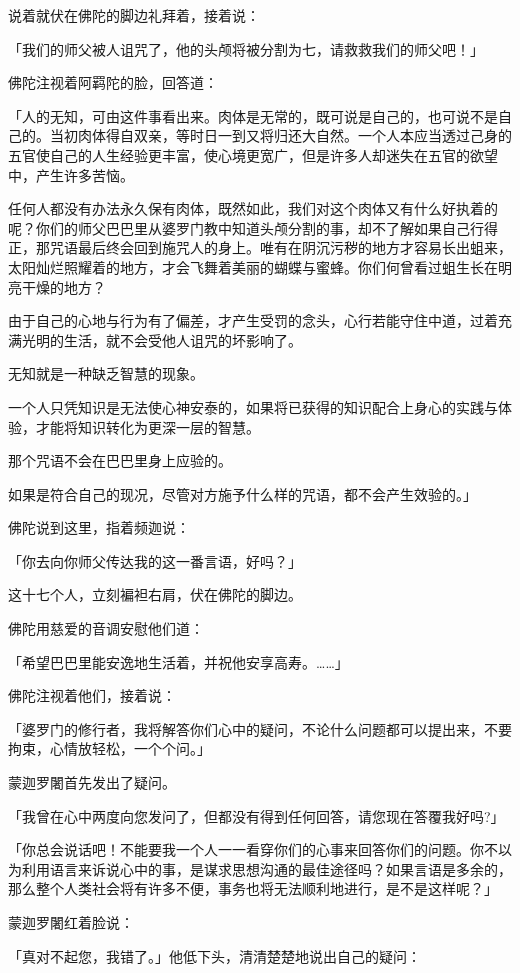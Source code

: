 \documentclass[twoside,openany]{book}
\begin{document}
说着就伏在佛陀的脚边礼拜着，接着说：

「我们的师父被人诅咒了，他的头颅将被分割为七，请救救我们的师父吧！」

佛陀注视着阿羁陀的脸，回答道：

「人的无知，可由这件事看出来。肉体是无常的，既可说是自己的，也可说不是自己的。当初肉体得自双亲，等时日一到又将归还大自然。一个人本应当透过己身的五官使自己的人生经验更丰富，使心境更宽广，但是许多人却迷失在五官的欲望中，产生许多苦恼。

任何人都没有办法永久保有肉体，既然如此，我们对这个肉体又有什么好执着的呢？你们的师父巴巴里从婆罗门教中知道头颅分割的事，却不了解如果自己行得正，那咒语最后终会回到施咒人的身上。唯有在阴沉污秽的地方才容易长出蛆来，太阳灿烂照耀着的地方，才会飞舞着美丽的蝴蝶与蜜蜂。你们何曾看过蛆生长在明亮干燥的地方？

由于自己的心地与行为有了偏差，才产生受罚的念头，心行若能守住中道，过着充满光明的生活，就不会受他人诅咒的坏影响了。

无知就是一种缺乏智慧的现象。

一个人只凭知识是无法使心神安泰的，如果将已获得的知识配合上身心的实践与体验，才能将知识转化为更深一层的智慧。

那个咒语不会在巴巴里身上应验的。

如果是符合自己的现况，尽管对方施予什么样的咒语，都不会产生效验的。」

佛陀说到这里，指着频迦说：

「你去向你师父传达我的这一番言语，好吗？」

这十七个人，立刻褊袒右肩，伏在佛陀的脚边。

佛陀用慈爱的音调安慰他们道：

「希望巴巴里能安逸地生活着，并祝他安享高寿。……」

佛陀注视着他们，接着说：

「婆罗门的修行者，我将解答你们心中的疑问，不论什么问题都可以提出来，不要拘束，心情放轻松，一个个问。」

蒙迦罗闍首先发出了疑问。

「我曾在心中两度向您发问了，但都没有得到任何回答，请您现在答覆我好吗?」

「你总会说话吧！不能要我一个人一一看穿你们的心事来回答你们的问题。你不以为利用语言来诉说心中的事，是谋求思想沟通的最佳途径吗？如果言语是多余的，那么整个人类社会将有许多不便，事务也将无法顺利地进行，是不是这样呢？」

蒙迦罗闍红着脸说：

「真对不起您，我错了。」他低下头，清清楚楚地说出自己的疑问：
\end{document}
